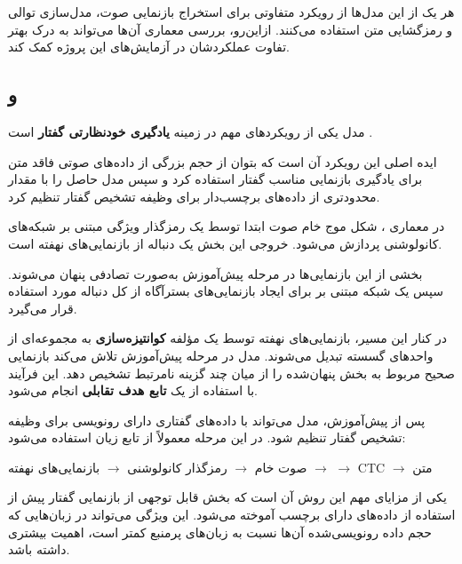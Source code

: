 هر یک از این مدل‌ها از رویکرد متفاوتی برای استخراج بازنمایی
صوت، مدل‌سازی توالی و رمزگشایی متن استفاده می‌کنند.
ازاین‌رو، بررسی معماری آن‌ها می‌تواند به درک بهتر تفاوت
عملکردشان در آزمایش‌های این پروژه کمک کند.


\subsection{ و }

مدل
یکی از رویکردهای مهم در زمینه
\textbf{یادگیری خودنظارتی گفتار}
است \cite{baevski2020wav2vec2}.

ایده اصلی این رویکرد آن است که بتوان از حجم بزرگی از داده‌های
صوتی فاقد متن برای یادگیری بازنمایی مناسب گفتار استفاده کرد
و سپس مدل حاصل را با مقدار محدودتری از داده‌های برچسب‌دار برای
وظیفه تشخیص گفتار تنظیم کرد.

در معماری ، شکل موج خام صوت ابتدا توسط یک
رمزگذار ویژگی مبتنی بر شبکه‌های کانولوشنی پردازش می‌شود.
خروجی این بخش یک دنباله از بازنمایی‌های نهفته
است.

بخشی از این بازنمایی‌ها در مرحله پیش‌آموزش به‌صورت تصادفی
پنهان می‌شوند.
سپس یک شبکه مبتنی بر
برای ایجاد بازنمایی‌های بسترآگاه از کل دنباله مورد استفاده
قرار می‌گیرد.

در کنار این مسیر، بازنمایی‌های نهفته توسط یک مؤلفه
\textbf{کوانتیزه‌سازی}
به مجموعه‌ای از واحدهای گسسته تبدیل می‌شوند.
مدل در مرحله پیش‌آموزش تلاش می‌کند بازنمایی صحیح مربوط به
بخش پنهان‌شده را از میان چند گزینه نامرتبط تشخیص دهد.
این فرآیند با استفاده از یک
\textbf{تابع هدف تقابلی}
انجام می‌شود.

پس از پیش‌آموزش، مدل می‌تواند با داده‌های گفتاری دارای
رونویسی برای وظیفه تشخیص گفتار تنظیم شود.
در این مرحله معمولاً از تابع زیان
استفاده می‌شود:

\begin{center}
صوت خام
$\longrightarrow$
رمزگذار کانولوشنی
$\longrightarrow$
بازنمایی‌های نهفته
$\longrightarrow$
$\longrightarrow$
CTC
$\longrightarrow$
متن
\end{center}

یکی از مزایای مهم این روش آن است که بخش قابل توجهی از
بازنمایی گفتار پیش از استفاده از داده‌های دارای برچسب آموخته
می‌شود.
این ویژگی می‌تواند در زبان‌هایی که حجم داده رونویسی‌شده آن‌ها
نسبت به زبان‌های پرمنبع کمتر است، اهمیت بیشتری داشته باشد.

